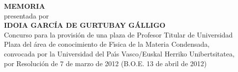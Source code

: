 \begin{titlepage}
\renewcommand{\baselinestretch}{2}
\vspace*{4cm}
\begin{center}
\textbf{\Huge MEMORIA}\\\vskip 2cm
{\Large presentada por}\\\vskip 2cm
\textbf{\Large IDOIA GARC\'{I}A DE GURTUBAY G\'{A}LLIGO}\\\vskip 2cm
{\Large Concurso para la provisi\'on de una plaza de Profesor Titular  de Universidad}\\\vskip 2cm
\vspace*{2cm}
Plaza del \'{a}rea de conocimiento de F\'{\i}sica de la Materia Condensada,\\
convocada por la Universidad del Pa\'{\i}s Vasco/Euskal Herriko Unibertsitatea,\\ por 
Resoluci\'{o}n de 7 de marzo de 2012 (B.O.E. 13 de abril de 2012) 
\end{center}
\end{titlepage}
\renewcommand{\baselinestretch}{1}
\thispagestyle{empty}

